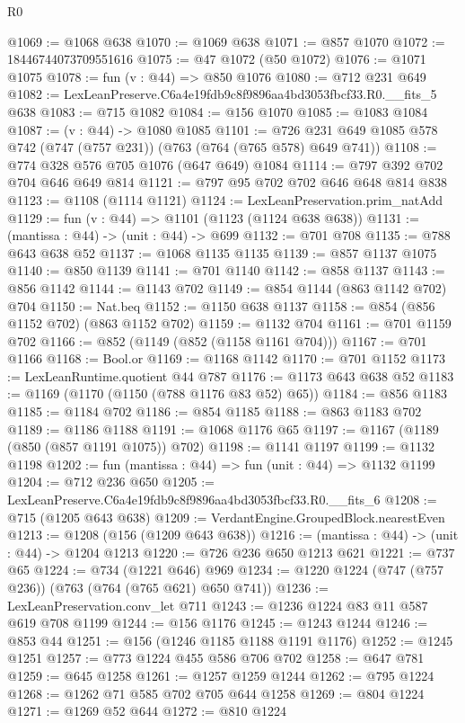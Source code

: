 \begin{lexlean}{R0}
\begin{coremodule}
@1069 := @1068 @638
@1070 := @1069 @638
@1071 := @857 @1070
@1072 := 18446744073709551616
@1075 := @47 @1072 (@50 @1072)
@1076 := @1071 @1075
@1078 := fun (v : @44) => @850 @1076
@1080 := @712 @231 @649
@1082 := LexLeanPreserve.C6a4e19fdb9c8f9896aa4bd3053fbcf33.R0.__fits_5 @638
@1083 := @715 @1082
@1084 := @156 @1070
@1085 := @1083 @1084
@1087 := (v : @44) -> @1080 @1085
@1101 := @726 @231 @649 @1085 @578 @742 (@747 (@757 @231)) (@763 (@764 (@765 @578) @649 @741))
@1108 := @774 @328 @576 @705 @1076 (@647 @649) @1084
@1114 := @797 @392 @702 @704 @646 @649 @814
@1121 := @797 @95 @702 @702 @646 @648 @814 @838
@1123 := @1108 (@1114 @1121)
@1124 := LexLeanPreservation.prim_natAdd
@1129 := fun (v : @44) => @1101 (@1123 (@1124 @638 @638))
@1131 := (mantissa : @44) -> (unit : @44) -> @699
@1132 := @701 @708
@1135 := @788 @643 @638 @52
@1137 := @1068 @1135 @1135
@1139 := @857 @1137 @1075
@1140 := @850 @1139
@1141 := @701 @1140
@1142 := @858 @1137
@1143 := @856 @1142
@1144 := @1143 @702
@1149 := @854 @1144 (@863 @1142 @702) @704
@1150 := Nat.beq
@1152 := @1150 @638 @1137
@1158 := @854 (@856 @1152 @702) (@863 @1152 @702)
@1159 := @1132 @704
@1161 := @701 @1159 @702
@1166 := @852 (@1149 (@852 (@1158 @1161 @704)))
@1167 := @701 @1166
@1168 := Bool.or
@1169 := @1168 @1142
@1170 := @701 @1152
@1173 := LexLeanRuntime.quotient @44 @787
@1176 := @1173 @643 @638 @52
@1183 := @1169 (@1170 (@1150 (@788 @1176 @83 @52) @65))
@1184 := @856 @1183
@1185 := @1184 @702
@1186 := @854 @1185
@1188 := @863 @1183 @702
@1189 := @1186 @1188
@1191 := @1068 @1176 @65
@1197 := @1167 (@1189 (@850 (@857 @1191 @1075)) @702)
@1198 := @1141 @1197
@1199 := @1132 @1198
@1202 := fun (mantissa : @44) => fun (unit : @44) => @1132 @1199
@1204 := @712 @236 @650
@1205 := LexLeanPreserve.C6a4e19fdb9c8f9896aa4bd3053fbcf33.R0.__fits_6
@1208 := @715 (@1205 @643 @638)
@1209 := VerdantEngine.GroupedBlock.nearestEven
@1213 := @1208 (@156 (@1209 @643 @638))
@1216 := (mantissa : @44) -> (unit : @44) -> @1204 @1213
@1220 := @726 @236 @650 @1213 @621
@1221 := @737 @65
@1224 := @734 (@1221 @646) @969
@1234 := @1220 @1224 (@747 (@757 @236)) (@763 (@764 (@765 @621) @650 @741))
@1236 := LexLeanPreservation.conv_let @711
@1243 := @1236 @1224 @83 @11 @587 @619 @708 @1199
@1244 := @156 @1176
@1245 := @1243 @1244
@1246 := @853 @44
@1251 := @156 (@1246 @1185 @1188 @1191 @1176)
@1252 := @1245 @1251
@1257 := @773 @1224 @455 @586 @706 @702
@1258 := @647 @781
@1259 := @645 @1258
@1261 := @1257 @1259 @1244
@1262 := @795 @1224
@1268 := @1262 @71 @585 @702 @705 @644 @1258
@1269 := @804 @1224
@1271 := @1269 @52 @644
@1272 := @810 @1224

\end{coremodule}
\end{lexlean}
